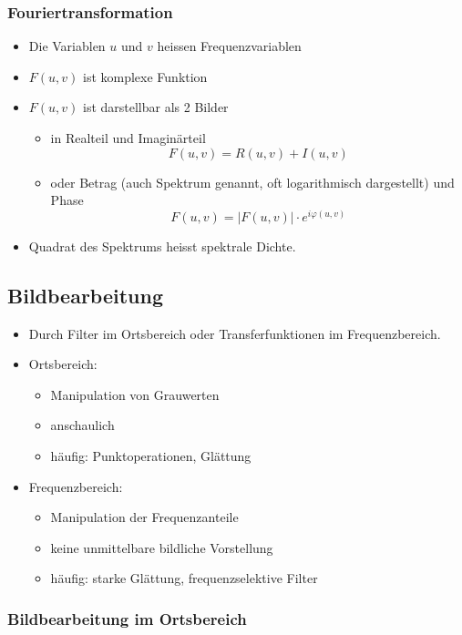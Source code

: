 \subsubsection*{Fouriertransformation}

\begin{itemize}
\item Die Variablen $u$ und $v$ heissen Frequenzvariablen
\item $F(u,v)$ ist komplexe Funktion
\item $F(u,v)$ ist darstellbar als 2 Bilder
\begin{itemize}
\item in Realteil und Imaginärteil $$F(u,v) = R(u,v) + I(u,v)$$
\item oder Betrag (auch Spektrum genannt, oft logarithmisch dargestellt) und Phase $$F(u,v) = |F(u,v)| \cdot e^{i \varphi (u,v)}$$
\end{itemize}
\item Quadrat des Spektrums heisst spektrale Dichte.
\end{itemize}

\subsection{Bildbearbeitung}

\begin{itemize}
\item Durch Filter im Ortsbereich oder Transferfunktionen im Frequenzbereich.
\item Ortsbereich:
\begin{itemize}
\item Manipulation von Grauwerten
\item anschaulich
\item häufig: Punktoperationen, Glättung
\end{itemize}
\item Frequenzbereich:
\begin{itemize}
\item Manipulation der Frequenzanteile
\item keine unmittelbare bildliche Vorstellung
\item häufig: starke Glättung, frequenzselektive Filter
\end{itemize}
\end{itemize}

\subsubsection*{Bildbearbeitung im Ortsbereich}

